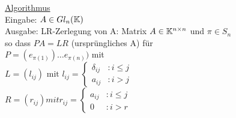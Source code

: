 \underline{Algorithmus} \\
Eingabe: $A \in Gl_n (\mathbb K)$ \\
Ausgabe: LR-Zerlegung von A:  Matrix $ A \in \mathbb K^{n \times n}$ und
$\pi \in S_n$ \\
so dass $PA = LR$ (ursprüngliches A) für \\
$P = (e_{\pi(1)}) \dots e_{\pi(n)})$ mit \\
$L = (l_{ij}) \text{ mit } l_{ij} =
\begin{cases} \delta_{ij} &: i \le j \\  a_{ij} &: i > j  \end{cases} $ \\
$R = (r_{ij}) mit r_{ij} =
\begin{cases} a_{ij} &: i \le j \\ 0 &: i > r  \end{cases}$
